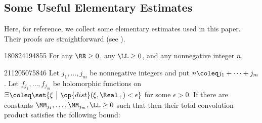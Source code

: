 \documentclass[11pt]{article}
\begin{document}
\begin{appendices}
\subsection{Some Useful Elementary Estimates}

Here, for reference, we collect some elementary estimates used in this paper.
Their proofs are straightforward (see \cite[Appendix C.4]{MY2008.06492}).

\begin{lem}{180824194855}
For any $\RR \geq 0$, any $\LL \geq 0$, and any nonnegative integer $n$,
\end{lem}

\begin{lem}{211205075846}
Let $j_1, \ldots, j_m$ be nonnegative integers and put $n \coleq j_1 + \cdots + j_m$.
Let $f_{j_1}, \ldots, f_{j_m}$ be holomorphic functions on $\Xi \coleq \set{\xi ~\big|~ \op{dist} (\xi, \Real_+) < \epsilon}$ for some $\epsilon > 0$.
If there are constants $\MM_{j_1}, \ldots, \MM_{j_m}, \LL \geq 0$ such that
then their total convolution product satisfies the following bound:
\end{lem}







\end{appendices}





%
\begin{adjustwidth}{-2cm}{-1.5cm}
{\footnotesize

%

}
\end{adjustwidth}
\end{document}

